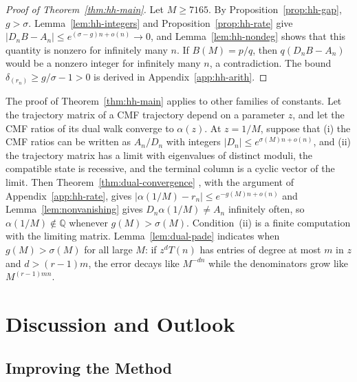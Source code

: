 \documentclass[oneside,english,11pt]{amsart}
\begin{document}
\begin{proof}[Proof of Theorem~\ref{thm:hh-main}]
Let $M\ge7165$. By Proposition~\ref{prop:hh-gap}, $g>\sigma$. Lemma~\ref{lem:hh-integers} and Proposition~\ref{prop:hh-rate} give
$|D_nB-A_n|\le e^{(\sigma-g)n+o(n)}\to0$, and Lemma~\ref{lem:hh-nondeg} shows that this quantity is nonzero for infinitely
many $n$. If $B(M)=p/q$, then $q(D_nB-A_n)$ would be a nonzero integer for infinitely many $n$, a contradiction.
The bound $\delta_{(r_n)}\ge g/\sigma-1>0$ is derived in Appendix~\ref{app:hh-arith}.
\end{proof}

\begin{remark}\label{rem:hh-other-families}
The proof of Theorem~\ref{thm:hh-main} applies to other families of constants.
Let the trajectory matrix of a CMF trajectory depend on a parameter $z$, and let the CMF ratios of its dual walk converge to $\alpha(z)$.
At $z=1/M$, suppose that
(i) the CMF ratios can be written as $A_n/D_n$ with integers $|D_n|\le e^{\sigma(M)n+o(n)}$, and
(ii) the trajectory matrix has a limit with eigenvalues of distinct moduli, the compatible state is recessive, and the terminal column is a cyclic vector of the limit.
Then Theorem~\ref{thm:dual-convergence}%
, with the argument of Appendix~\ref{app:hh-rate},
gives $|\alpha(1/M)-r_n|\le e^{-g(M)n+o(n)}$ and Lemma~\ref{lem:nonvanishing} gives $D_n\alpha(1/M)\ne A_n$ infinitely often, so $\alpha(1/M)\notin\mathbb Q$ whenever $g(M)>\sigma(M)$.
Condition~(ii) is a finite computation with the limiting matrix.
Lemma~\ref{lem:dual-pade} indicates when $g(M)>\sigma(M)$ for all large $M$: if $z^dT(n)$ has entries of degree at most $m$ in $z$ and $d>(r-1)m$, the error decays like $M^{-dn}$ while the denominators grow like $M^{(r-1)mn}$.
\end{remark}



\section{Discussion and Outlook}
\label{sec:outlook}


\subsection{Improving the Method}
\end{document}
